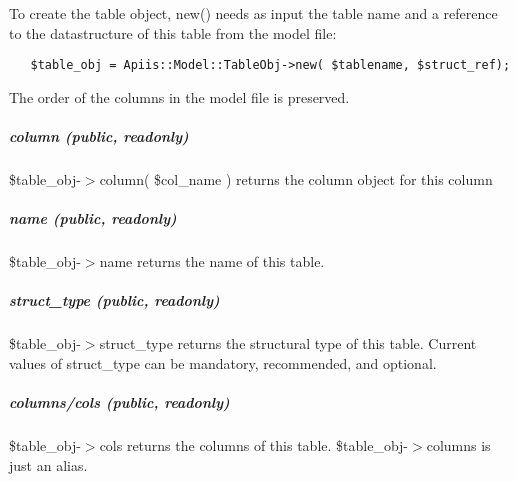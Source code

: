 To create the table object, new() needs as input the table name and a
reference to the datastructure of this table from the model file:

\begin{verbatim}
   $table_obj = Apiis::Model::TableObj->new( $tablename, $struct_ref);
\end{verbatim}


The order of the columns in the model file is preserved.

\subparagraph*{column (public, readonly)\label{Apiis::Model::TableObj_--_internal_package_to_provide_a_table_object_with_methods_to_access_a_single_table_and_its_columns_column_public_readonly_}}


\$table\_obj-$>$column( \$col\_name ) returns the column object for this column

\subparagraph*{name (public, readonly)\label{Apiis::Model::TableObj_--_internal_package_to_provide_a_table_object_with_methods_to_access_a_single_table_and_its_columns_name_public_readonly_}}


\$table\_obj-$>$name returns the name of this table.

\subparagraph*{struct\_type (public, readonly)\label{Apiis::Model::TableObj_--_internal_package_to_provide_a_table_object_with_methods_to_access_a_single_table_and_its_columns_struct_type_public_readonly_}}


\$table\_obj-$>$struct\_type returns the structural type of this table.
Current values of struct\_type can be mandatory, recommended, and optional.

\subparagraph*{columns/cols (public, readonly)\label{Apiis::Model::TableObj_--_internal_package_to_provide_a_table_object_with_methods_to_access_a_single_table_and_its_columns_columns_cols_public_readonly_}}


\$table\_obj-$>$cols returns the columns of this table.
\$table\_obj-$>$columns is just an alias.

